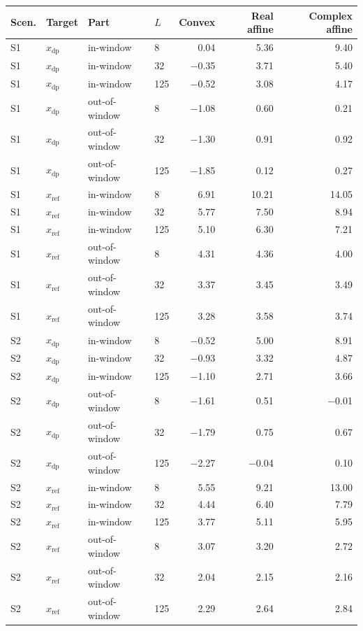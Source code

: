 \begin{tabular}{@{}llllrrr@{}}
\toprule
Scen. & Target & Part & $L$ & Convex & Real affine & Complex affine \\
\midrule
S1 & $x_{\mathrm{dp}}$ & in-window & 8 & 0.04 & 5.36 & 9.40 \\
S1 & $x_{\mathrm{dp}}$ & in-window & 32 & $-$0.35 & 3.71 & 5.40 \\
S1 & $x_{\mathrm{dp}}$ & in-window & 125 & $-$0.52 & 3.08 & 4.17 \\
S1 & $x_{\mathrm{dp}}$ & out-of-window & 8 & $-$1.08 & 0.60 & 0.21 \\
S1 & $x_{\mathrm{dp}}$ & out-of-window & 32 & $-$1.30 & 0.91 & 0.92 \\
S1 & $x_{\mathrm{dp}}$ & out-of-window & 125 & $-$1.85 & 0.12 & 0.27 \\
S1 & $x_{\mathrm{ref}}$ & in-window & 8 & 6.91 & 10.21 & 14.05 \\
S1 & $x_{\mathrm{ref}}$ & in-window & 32 & 5.77 & 7.50 & 8.94 \\
S1 & $x_{\mathrm{ref}}$ & in-window & 125 & 5.10 & 6.30 & 7.21 \\
S1 & $x_{\mathrm{ref}}$ & out-of-window & 8 & 4.31 & 4.36 & 4.00 \\
S1 & $x_{\mathrm{ref}}$ & out-of-window & 32 & 3.37 & 3.45 & 3.49 \\
S1 & $x_{\mathrm{ref}}$ & out-of-window & 125 & 3.28 & 3.58 & 3.74 \\
S2 & $x_{\mathrm{dp}}$ & in-window & 8 & $-$0.52 & 5.00 & 8.91 \\
S2 & $x_{\mathrm{dp}}$ & in-window & 32 & $-$0.93 & 3.32 & 4.87 \\
S2 & $x_{\mathrm{dp}}$ & in-window & 125 & $-$1.10 & 2.71 & 3.66 \\
S2 & $x_{\mathrm{dp}}$ & out-of-window & 8 & $-$1.61 & 0.51 & $-$0.01 \\
S2 & $x_{\mathrm{dp}}$ & out-of-window & 32 & $-$1.79 & 0.75 & 0.67 \\
S2 & $x_{\mathrm{dp}}$ & out-of-window & 125 & $-$2.27 & $-$0.04 & 0.10 \\
S2 & $x_{\mathrm{ref}}$ & in-window & 8 & 5.55 & 9.21 & 13.00 \\
S2 & $x_{\mathrm{ref}}$ & in-window & 32 & 4.44 & 6.40 & 7.79 \\
S2 & $x_{\mathrm{ref}}$ & in-window & 125 & 3.77 & 5.11 & 5.95 \\
S2 & $x_{\mathrm{ref}}$ & out-of-window & 8 & 3.07 & 3.20 & 2.72 \\
S2 & $x_{\mathrm{ref}}$ & out-of-window & 32 & 2.04 & 2.15 & 2.16 \\
S2 & $x_{\mathrm{ref}}$ & out-of-window & 125 & 2.29 & 2.64 & 2.84 \\
\bottomrule
\end{tabular}
